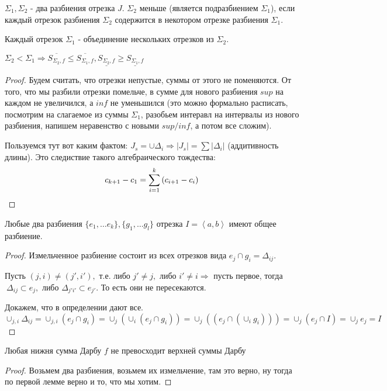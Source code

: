 \documentclass[12pt]{report}
\begin{document}
\begin{defn}
$\Sigma_1, \Sigma_2$ - два разбиения отрезка $J$. $\Sigma_2$ меньше (является подразбиением $\Sigma_1$), если каждый отрезок разбиения $\Sigma_2$ содержится в некотором отрезке разбиения $\Sigma_1$.

Каждый отрезок $\Sigma_1$ - объединение нескольких отрезков из $\Sigma_2$.
\end{defn}

\begin{lm}
$\Sigma_2 < \Sigma_1 \Rightarrow \overline{S_{\Sigma_2, f}} \le \overline{S_{\Sigma_1, f}}, \underline{S_{\Sigma_2, f}} \ge \underline{S_{\Sigma_1, f}}$
\end{lm}
\begin{proof}
Будем считать, что отрезки непустые, суммы от этого не поменяются. От того, что мы разбили отрезки помельче, в сумме для нового разбиения $sup$ на каждом не увеличился, а $inf$ не уменьшился (это можно формально расписать, посмотрим на слагаемое из суммы $\Sigma_1$, разобьем интеравл на интервалы из нового разбиения, напишем неравенство с новыми $sup/inf$, а потом все сложим).

Пользуемся тут вот каким фактом: $J_s = \cup \Delta_i \Rightarrow |J_s| = \sum{|\Delta_i|}$ (аддитивность длины).
Это следиствие такого алгебраического тождества:
$$c_{k + 1} - c_1 = \sum\limits_{i = 1}^k{(c_{i + 1} - c_i)}$$
\end{proof}

\begin{lm}[2]
Любые два разбиения $\{e_1, \dots e_k\}, \{g_1, \dots g_l\}$ отрезка $I  = \left<a, b\right>$ имеют общее разбиение.
\end{lm}
\begin{proof}
Измельченное разбиение состоит из всех отрезков вида $e_j \cap g_i = \Delta_{ij}$.

Пусть $(j, i) \neq (j', i'),$ т.е. либо $j' \neq j,$ либо $i' \neq i \Rightarrow$ пусть первое, тогда $ ~\Delta_{ij} \subset e_j,$ либо $\Delta_{j'i'} \subset e_{j'}$. То есть они не пересекаются.

Докажем, что в определении дают все. $\cup_{j, i}\Delta_{ij} = \cup_{j, i}(e_j \cap g_i) = \cup_j\left(\cup_i(e_j \cap g_i)\right) =\cup_j\left((e_j \cap (\cup_i g_i))\right) = \cup_j(e_j \cap I) = \cup_j e_j = I$
\end{proof}

\begin{lm}[3]
Любая нижня сумма Дарбу $f$ не превосходит верхней суммы Дарбу 
\end{lm}
\begin{proof}
Возьмем два разбиения, возьмем их измельчение, там это верно, ну тогда по первой лемме верно и то, что мы хотим.
\end{proof}
\end{document}
